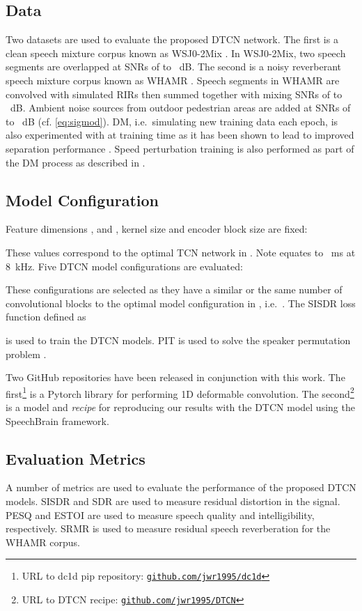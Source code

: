 \documentclass{article}
\begin{document}
\subsection{Data}
Two datasets are used to evaluate the proposed \ac{DTCN} network. The first is a clean speech mixture corpus known as WSJ0-2Mix \cite{Hershey2016mar}. In WSJ0-2Mix, two speech segments are overlapped at SNRs of  to ~dB. The second is a noisy reverberant speech mixture corpus known as WHAMR \cite{WHAMR}. Speech segments in WHAMR are convolved with simulated \acp{RIR} then summed together with mixing SNRs of  to ~dB. Ambient noise sources from outdoor pedestrian areas are added at SNRs of  to ~dB (cf. \eqref{eq:sigmod}). \Ac{DM}, i.e.~simulating new training data each epoch, is also experimented with at training time as it has been shown to lead to improved separation performance \cite{sepformer,QDPN}. Speed perturbation training is also performed as part of the \ac{DM} process as described in \cite{sepformer}.

\subsection{Model Configuration}
Feature dimensions ,  and , kernel size  and encoder block size  are fixed:
 
These values correspond to the optimal \ac{TCN} network in \cite{convtasnet}. Note  equates to ~ms at 8~kHz.
Five \ac{DTCN} model configurations are evaluated:

These configurations are selected as they have a similar or the same number of convolutional blocks to the optimal model configuration in \cite{convtasnet}, i.e.~. 
The \ac{SISDR} loss function \cite{tasnet} defined as 

is used to train the \ac{DTCN} models. \Ac{PIT} is used to solve the speaker permutation problem \cite{upit}.

Two GitHub repositories have been released in conjunction with this work. The first\footnote{URL to dc1d pip repository: \href{https://github.com/jwr1995/dc1d}{\tt github.com/jwr1995/dc1d}} is a Pytorch library for performing 1D deformable convolution. The second\footnote{URL to \ac{DTCN} recipe: \href{https://github.com/jwr1995/DTCN}{\tt github.com/jwr1995/DTCN}} is a model and \textit{recipe} for reproducing our results with the \ac{DTCN} model using the SpeechBrain \cite{speechbrain} framework.

\subsection{Evaluation Metrics}
A number of metrics are used to evaluate the performance of the proposed \ac{DTCN} models. \Ac{SISDR} and \ac{SDR} \cite{LeRoux} are used to measure residual distortion in the signal. \Ac{PESQ} \cite{PESQ} and \ac{ESTOI} \cite{estoi} are used to measure speech quality and intelligibility, respectively. \Ac{SRMR} \cite{srmr} is used to measure residual speech reverberation for the WHAMR corpus.
\end{document}
